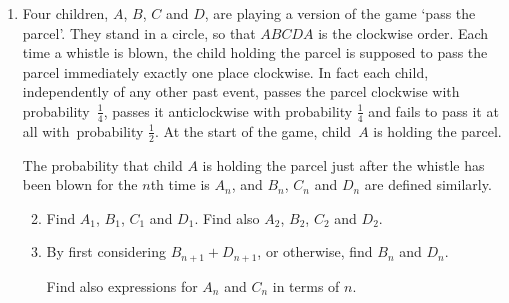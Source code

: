 \documentclass[a4, 11pt]{report}
\newlength{\qspace}
\newcounter{qnumber}
\newenvironment{question}%
 {\vspace{\qspace}
  \begin{enumerate}[\bfseries 1\quad][10]%
    \setcounter{enumi}{\value{qnumber}}%
    \item%
 }
{
  \end{enumerate}
  \filbreak
  \stepcounter{qnumber}
 }
\newenvironment{questionparts}[1][1]%
 {
  \begin{enumerate}[\bfseries (i)]%
    \setcounter{enumii}{#1}
    \addtocounter{enumii}{-1}
    \setlength{\itemsep}{5mm}
    \setlength{\parskip}{5pt}
 }
 {
  \end{enumerate}
 }
\begin{document}
\begin{question}
Four children, $A$, $B$, $C$ and $D$, 
are playing a version of the game `pass the parcel'. 
They stand in a circle, so that $ABCDA$ 
is the clockwise order.
Each time a whistle is blown, the child holding the parcel is 
supposed to pass the parcel immediately exactly one place clockwise. In 
fact each child, independently of any other past event, 
passes the parcel clockwise with probability~$\frac{1}{4}$, 
passes it anticlockwise with probability 
$\frac{1}{4}$ and fails to pass it at all with~probability $\frac{1}{2}$. 
At the start of the game, child~$A$ is holding the parcel.

The probability that child $A$ is holding the parcel 
just after the whistle has been blown for the $n$th  time 
 is $A_n$, and   
$B_n$, $C_n$ and $D_n$ are defined similarly. 

\begin{questionparts}
\item 
Find $A_1$, $B_1$, $C_1$ and $D_1$. Find also 
 $A_2$, $B_2$, $C_2$ and $D_2$. 

\item 

By first considering $B_{n+1}+D_{n+1}$, or  otherwise,  
find $B_n$ and $D_n$.

Find also expressions for $A_n$ and $C_n$ in terms of $n$.


 
\end{questionparts}
\end{question}
\end{document}
